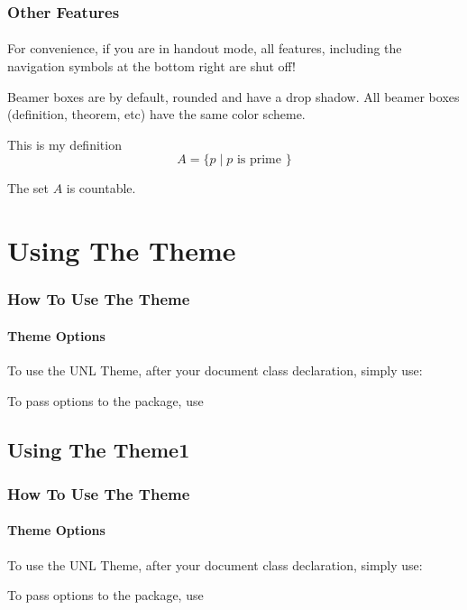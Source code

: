 \documentclass{beamer}
\begin{document}
\begin{frame}  %
    \frametitle{Other Features}
    \framesubtitle{}
    
    For convenience, if you are in handout mode, all features, including the
    navigation symbols at the bottom right are shut off!


    Beamer boxes are by default, rounded and have a drop shadow.  All beamer
    boxes (definition, theorem, etc) have the same color scheme.

    \begin{definition}
      This is my definition
      $$A = \{p \mid \textrm{$p$ is prime }\}$$
    \end{definition}
    
    \begin{theorem}
      The set $A$ is countable.
    \end{theorem}

\end{frame}

\section{Using The Theme}

\begin{frame}[fragile]
    \frametitle{How To Use The Theme}
    \framesubtitle{Theme Options}
    
    To use the UNL Theme, after your document class declaration, simply use:
    
    
    To pass options to the package, use
    
    
\end{frame}
\subsection{Using The Theme1}

\begin{frame}[fragile]
    \frametitle{How To Use The Theme}
    \framesubtitle{Theme Options}
    
    To use the UNL Theme, after your document class declaration, simply use:
    
    
    To pass options to the package, use
    
    
\end{frame}
\end{document}
